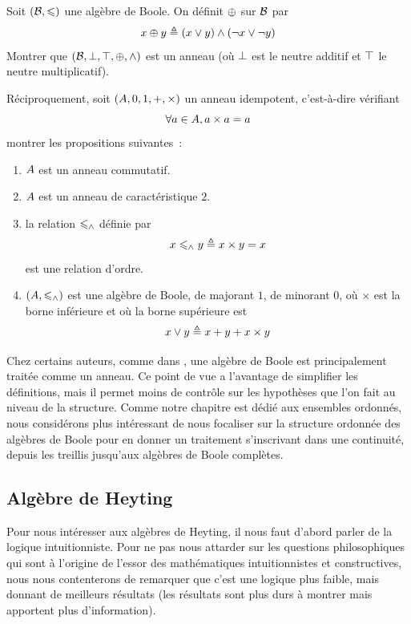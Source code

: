 \begin{exercise}
  Soit $(\mathcal{B},\leqslant)$ une algèbre de Boole. On définit $\oplus$ sur
  $\mathcal{B}$ par
  \[x\oplus y \triangleq (x\vee y) \wedge (\lnot x \vee \lnot y)\]
  Montrer que $(\mathcal{B},\bot,\top,\oplus,\wedge)$ est un anneau (où $\bot$ est le
  neutre additif et $\top$ le neutre multiplicatif).

  Réciproquement, soit $(A,0,1,+,\times)$ un anneau idempotent,
  c'est-à-dire vérifiant
  \[\forall a\in A, a\times a = a\]
  montrer les propositions suivantes~:
  \begin{enumerate}[label=(\roman*)]
  \item $A$ est un anneau commutatif.
  \item $A$ est un anneau de caractéristique $2$.
  \item la relation $\leqslant_{\wedge}$ définie par
    \[x\leqslant_{\wedge} y \triangleq x\times y = x\]
    est une relation d'ordre.
  \item $(A,\leqslant_{\wedge})$ est une algèbre de Boole, de majorant $1$, de
    minorant $0$, où $\times$ est la borne inférieure et où la borne supérieure
    est
    \[x\vee y \triangleq x + y + x \times y\]
  \end{enumerate}
\end{exercise}

\begin{remark}
  Chez certains auteurs, comme dans \cite{Halmos1974}, une algèbre de
  Boole est principalement traitée comme un anneau. Ce point de vue a
  l'avantage de simplifier les définitions, mais il permet moins de contrôle
  sur les hypothèses que l'on fait au niveau de la structure. Comme notre
  chapitre est dédié aux ensembles ordonnés, nous considérons plus intéressant
  de nous focaliser sur la structure ordonnée des algèbres de Boole pour
  en donner un traitement s'inscrivant dans une continuité, depuis les treillis
  jusqu'aux algèbres de Boole complètes.
\end{remark}

\subsection{Algèbre de Heyting}\label{subsec.heyting.alg}

Pour nous intéresser aux algèbres de Heyting, il nous faut d'abord parler
de la logique intuitionniste. Pour ne pas nous attarder sur les questions
philosophiques qui sont à l'origine de l'essor des mathématiques intuitionnistes
et constructives, nous nous contenterons de remarquer que c'est une logique plus
faible, mais donnant de meilleurs résultats (les résultats sont plus durs à
montrer mais apportent plus d'information).

